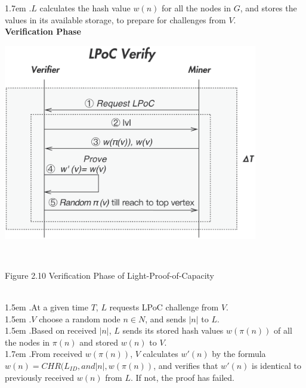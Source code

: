 \documentclass[10pt,a4paper]{article}
\begin{document}
\hangindent 1.7em
.\quad $L$ calculates the hash value $w(n)$ for all the nodes in $G$, and stores the values in its available storage, to prepare for challenges from $V$.
\vspace{-0.5em}
\\

\noindent   
 {\bf Verification Phase}\\
\centerline{\includegraphics[width=315pt]{fig10}}
 \\ \centerline{{Figure 2.10 Verification Phase of Light-Proof-of-Capacity}}
 \vspace{-1.5em}
\\

\hangindent 1.5em
.\quad At a given time $T$, $L$ requests LPoC challenge from $V$.
\vspace{-0.8em}
\\

\hangindent 1.5em
.\quad $V$ choose a random node $n \in N$, and sends $|n|$ to $L$.
\vspace{-0.8em}
\\

\hangindent 1.5em
.\quad Based on received $|n|$, $L$ sends its stored hash values $w(\pi(n))$ of all the nodes in $\pi(n)$ and stored $w(n)$ to $V$.
\vspace{-0.8em}
\\

\hangindent 1.7em
.\quad From received $w(\pi(n))$, $V$ calculates $w'(n)$ by the formula $w(n)=CHR(L_{ID}, and |n|, w(\pi(n))$, and verifies that $w'(n)$ is identical to previously received $w(n)$ from $L$. If not, the proof has failed.
\vspace{-0.8em}
\\
\end{document}
